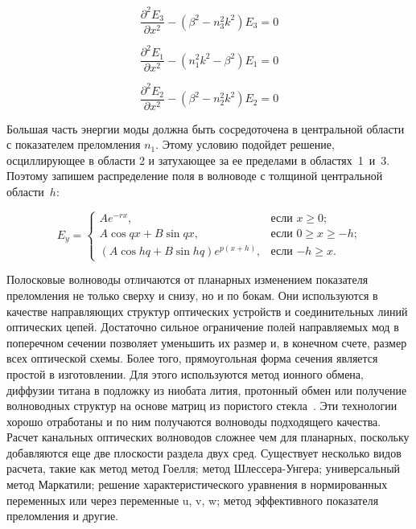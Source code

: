 \begin{equation}
	\frac{\partial^2 E_3}{\partial x^2} -(\beta^2 - n_3^2 k^2)E_3 = 0
\end{equation}

\begin{equation}
	\frac{\partial^2 E_1}{\partial x^2} -(n_1^2 k^2 - \beta^2)E_1 = 0
\end{equation}

\begin{equation}
	\frac{\partial^2 E_2}{\partial x^2} -(\beta^2 - n_2^2 k^2)E_2 = 0
\end{equation}

Большая часть энергии моды должна быть сосредоточена в центральной области с показателем преломления $n_1$. Этому условию подойдет решение, осциллирующее в области 2 и затухающее за ее пределами в областях~1~и~3. Поэтому запишем распределение поля в волноводе с толщиной центральной области~$h$:

\begin{equation}
	E_y =
	\begin{cases}
		Ae^{-rx}, &\text{если $x \geqslant 0$;}\\
		A\cos qx + B\sin qx, &\text{если $0 \geqslant x \geqslant -h $;}\\
		(A\cos hq + B\sin hq)e^{p(x+h)}, &\text{если $-h \geqslant x$.}
	\end{cases}
\end{equation}

Полосковые волноводы отличаются от планарных изменением показателя преломления не только сверху и снизу, но и по бокам. Они используются в качестве направляющих структур оптических устройств и соединительных линий оптических цепей. Достаточно сильное ограничение полей направляемых мод в поперечном сечении позволяет уменьшить их размер и, в конечном счете, размер всех оптической схемы. Более того, прямоугольная форма сечения является простой в изготовлении. Для этого используются метод ионного обмена, диффузии титана в подложку из ниобата лития, протонный обмен или получение волноводных структур на основе матриц из пористого стекла~\cite{vlada}. Эти технологии хорошо отработаны и по ним получаются волноводы подходящего качества.
Расчет канальных оптических волноводов сложнее чем для планарных, поскольку добавляются еще две плоскости раздела двух сред. Существует несколько видов расчета, такие как метод метод Гоелля; метод Шлессера-Унгера; универсальный метод Маркатили; решение характеристического уравнения в нормированных переменных или через переменные u, v, w; метод эффективного показателя преломления и другие.

